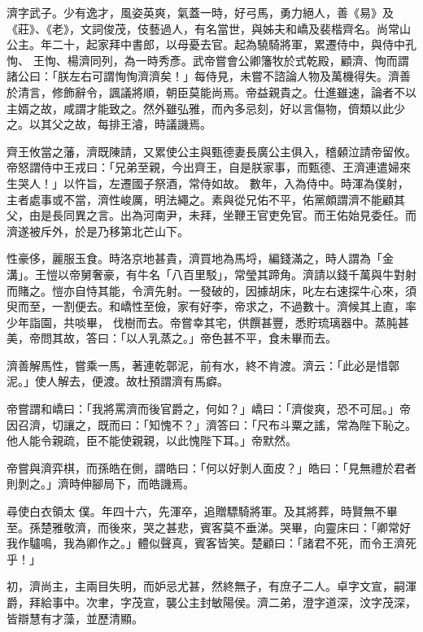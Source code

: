\begin{pinyinscope}
 濟字武子。少有逸才，風姿英爽，氣蓋一時，好弓馬，勇力絕人，善《易》及《莊》、《老》，文詞俊茂，伎藝過人，有名當世，與姊夫和嶠及裴楷齊名。尚常山公主。年二十，起家拜中書郎，以母憂去官。起為驍騎將軍，累遷侍中，與侍中孔恂、
 王恂、楊濟同列，為一時秀彥。武帝嘗會公卿籓牧於式乾殿，顧濟、恂而謂諸公曰：「朕左右可謂恂恂濟濟矣！」每侍見，未嘗不諮論人物及萬機得失。濟善於清言，修飾辭令，諷議將順，朝臣莫能尚焉。帝益親貴之。仕進雖速，論者不以主婿之故，咸謂才能致之。然外雖弘雅，而內多忌刻，好以言傷物，儕類以此少之。以其父之故，每排王濬，時議譏焉。



 齊王攸當之藩，濟既陳請，又累使公主與甄德妻長廣公主俱入，稽顙泣請帝留攸。帝怒謂侍中王戎曰：「兄弟至親，今出齊王，自是朕家事，而甄德、王濟連遣婦來生哭人！」以忤旨，左遷國子祭酒，常侍如故。
 數年，入為侍中。時渾為僕射，主者處事或不當，濟性峻厲，明法繩之。素與從兄佑不平，佑黨頗謂濟不能顧其父，由是長同異之言。出為河南尹，未拜，坐鞭王官吏免官。而王佑始見委任。而濟遂被斥外，於是乃移第北芒山下。



 性豪侈，麗服玉食。時洛京地甚貴，濟買地為馬埒，編錢滿之，時人謂為「金溝」。王愷以帝舅奢豪，有牛名「八百里駁」，常瑩其蹄角。濟請以錢千萬與牛對射而賭之。愷亦自恃其能，令濟先射。一發破的，因據胡床，叱左右速探牛心來，須臾而至，一割便去。和嶠性至儉，家有好李，帝求之，不過數十。濟候其上直，率少年詣園，共啖畢，
 伐樹而去。帝嘗幸其宅，供饌甚豐，悉貯琉璃器中。蒸肫甚美，帝問其故，答曰：「以人乳蒸之。」帝色甚不平，食未畢而去。



 濟善解馬性，嘗乘一馬，著連乾鄣泥，前有水，終不肯渡。濟云：「此必是惜鄣泥。」使人解去，便渡。故杜預謂濟有馬癖。



 帝嘗謂和嶠曰：「我將罵濟而後官爵之，何如？」嶠曰：「濟俊爽，恐不可屈。」帝因召濟，切讓之，既而曰：「知愧不？」濟答曰：「尺布斗粟之謠，常為陛下恥之。他人能令親疏，臣不能使親親，以此愧陛下耳。」帝默然。



 帝嘗與濟弈棋，而孫皓在側，謂皓曰：「何以好剝人面皮？」皓曰：「見無禮於君者則剝之。」濟時伸腳局下，而皓譏焉。



 尋使白衣領太
 僕。年四十六，先渾卒，追贈驃騎將軍。及其將葬，時賢無不畢至。孫楚雅敬濟，而後來，哭之甚悲，賓客莫不垂涕。哭畢，向靈床曰：「卿常好我作驢鳴，我為卿作之。」體似聲真，賓客皆笑。楚顧曰：「諸君不死，而令王濟死乎！」



 初，濟尚主，主兩目失明，而妒忌尤甚，然終無子，有庶子二人。卓字文宣，嗣渾爵，拜給事中。次聿，字茂宣，襲公主封敏陽侯。濟二弟，澄字道深，汶字茂深，皆辯慧有才藻，並歷清顯。




\end{pinyinscope}
